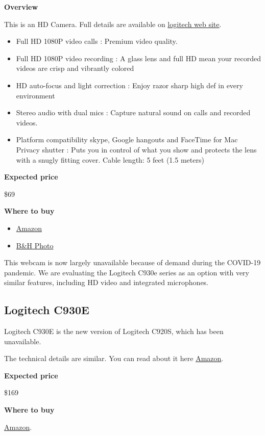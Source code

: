 \begin{gram}
\textbf{Overview}

This is an HD Camera.  Full details are available on 
%
\href{https://www.logitech.com/en-us/product/hd-pro-webcam-c920s}{logitech web site}.
%
\begin{itemize}
\item
Full HD 1080P video calls : Premium video quality.
\item
Full HD 1080P video recording : A glass lens and full HD mean your recorded videos are crisp and vibrantly colored
\item
HD auto-focus and light correction : Enjoy razor sharp high def in every environment

\item
Stereo audio with dual mics : Capture natural sound on calls and recorded videos. 

\item 
Platform compatibility skype, Google hangouts and FaceTime for Mac
Privacy shutter : Puts you in control of what you show and protects the lens with a snugly fitting cover. Cable length: 5 feet (1.5 meters)
\end{itemize}


\textbf{Expected price}

\$69

\textbf{Where to buy}

\begin{itemize}
\item
\href{https://www.amazon.com/Logitech-Widescreen-Calling-Recording-Desktop/dp/B006JH8T3S/ref=sr_1_2?crid=2T6CQ3HNRR1XR&keywords=logitech+c920&qid=1582900645&s=electronics&sprefix=logitech+c,electronics,172&sr=1-2}{Amazon}
\item
\href{https://www.bhphotovideo.com/c/product/1461727-REG/logitech_960_001257_c920s_hd_pro_webcam.html}{B\&H Photo}
\end{itemize}

This webcam is now largely unavailable because of demand during the
COVID-19 pandemic. We are evaluating the Logitech C930e series as an
option with very similar features, including HD video and integrated
microphones.
\end{gram}

\subsection{Logitech C930E}

\begin{gram}
Logitech C930E is the new version of Logitech C920S, which has been unavailable.

The technical details are similar.  You can read about it here
%
\href{https://www.amazon.com/Logitech-C930e-1080P-Video-Webcam/dp/B00CRJWW2G}{Amazon}.

\textbf{Expected price}

\$169

\textbf{Where to buy}

\href{https://www.amazon.com/Logitech-C930e-1080P-Video-Webcam/dp/B00CRJWW2G}{Amazon}.


\end{gram}

